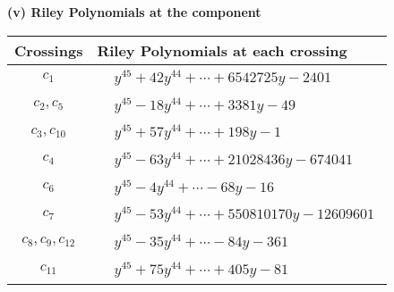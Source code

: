\documentclass[1p]{elsarticle_modified}
\theoremstyle{definition}
\begin{document}
\newpage\renewcommand{\arraystretch}{1}
\flushleft \textbf{(v) Riley Polynomials at the component}\newline \\
\begin{tabular}{m{50pt}|m{274pt}}
Crossings & \hspace{64pt}Riley Polynomials at each crossing \\
\hline $$\begin{aligned}c_{1}\end{aligned}$$&$\begin{aligned}
&y^{45}+42 y^{44}+\cdots+6542725 y-2401
\end{aligned}$\\
\hline $$\begin{aligned}c_{2},c_{5}\end{aligned}$$&$\begin{aligned}
&y^{45}-18 y^{44}+\cdots+3381 y-49
\end{aligned}$\\
\hline $$\begin{aligned}c_{3},c_{10}\end{aligned}$$&$\begin{aligned}
&y^{45}+57 y^{44}+\cdots+198 y-1
\end{aligned}$\\
\hline $$\begin{aligned}c_{4}\end{aligned}$$&$\begin{aligned}
&y^{45}-63 y^{44}+\cdots+21028436 y-674041
\end{aligned}$\\
\hline $$\begin{aligned}c_{6}\end{aligned}$$&$\begin{aligned}
&y^{45}-4 y^{44}+\cdots-68 y-16
\end{aligned}$\\
\hline $$\begin{aligned}c_{7}\end{aligned}$$&$\begin{aligned}
&y^{45}-53 y^{44}+\cdots+550810170 y-12609601
\end{aligned}$\\
\hline $$\begin{aligned}c_{8},c_{9},c_{12}\end{aligned}$$&$\begin{aligned}
&y^{45}-35 y^{44}+\cdots-84 y-361
\end{aligned}$\\
\hline $$\begin{aligned}c_{11}\end{aligned}$$&$\begin{aligned}
&y^{45}+75 y^{44}+\cdots+405 y-81
\end{aligned}$\\
\hline
\end{tabular}\\~\\
\end{document}
